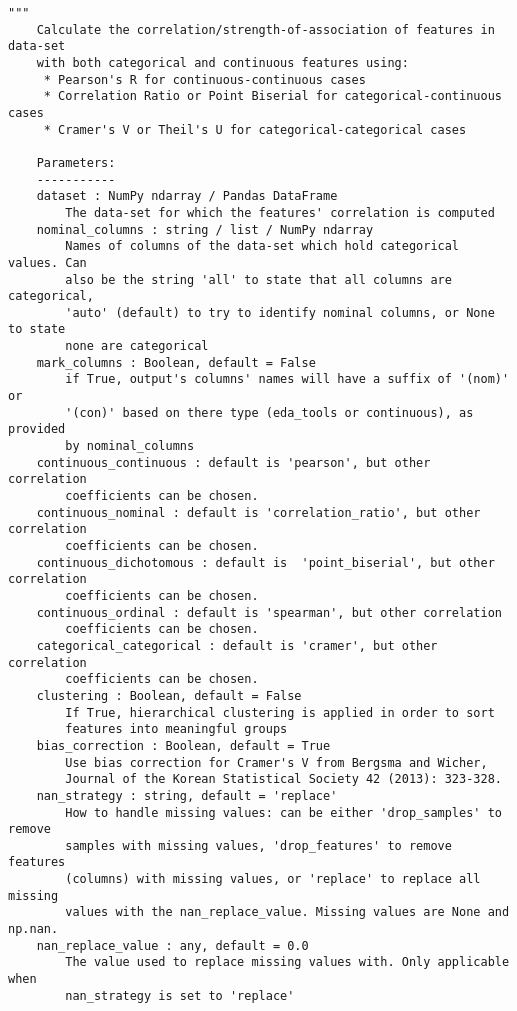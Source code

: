 \begin{lstlisting}[basicstyle=\tiny, style=py, caption={Implementation of \textit{compute correlations}}, label=lst:compute_correlation] 
    """
    Calculate the correlation/strength-of-association of features in data-set
    with both categorical and continuous features using:
     * Pearson's R for continuous-continuous cases
     * Correlation Ratio or Point Biserial for categorical-continuous cases
     * Cramer's V or Theil's U for categorical-categorical cases
    
    Parameters:
    -----------
    dataset : NumPy ndarray / Pandas DataFrame
        The data-set for which the features' correlation is computed
    nominal_columns : string / list / NumPy ndarray
        Names of columns of the data-set which hold categorical values. Can
        also be the string 'all' to state that all columns are categorical,
        'auto' (default) to try to identify nominal columns, or None to state
        none are categorical
    mark_columns : Boolean, default = False
        if True, output's columns' names will have a suffix of '(nom)' or
        '(con)' based on there type (eda_tools or continuous), as provided
        by nominal_columns
    continuous_continuous : default is 'pearson', but other correlation
        coefficients can be chosen.
    continuous_nominal : default is 'correlation_ratio', but other correlation
        coefficients can be chosen.
    continuous_dichotomous : default is  'point_biserial', but other correlation
        coefficients can be chosen.
    continuous_ordinal : default is 'spearman', but other correlation
        coefficients can be chosen.
    categorical_categorical : default is 'cramer', but other correlation
        coefficients can be chosen.
    clustering : Boolean, default = False
        If True, hierarchical clustering is applied in order to sort
        features into meaningful groups
    bias_correction : Boolean, default = True
        Use bias correction for Cramer's V from Bergsma and Wicher,
        Journal of the Korean Statistical Society 42 (2013): 323-328.
    nan_strategy : string, default = 'replace'
        How to handle missing values: can be either 'drop_samples' to remove
        samples with missing values, 'drop_features' to remove features
        (columns) with missing values, or 'replace' to replace all missing
        values with the nan_replace_value. Missing values are None and np.nan.
    nan_replace_value : any, default = 0.0
        The value used to replace missing values with. Only applicable when
        nan_strategy is set to 'replace'
    

\end{lstlisting}
